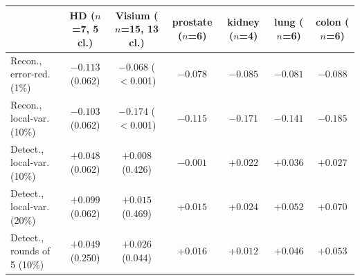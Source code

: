 \begin{tabular}{lcccccc}
\toprule
 & HD ($n$=7, 5 cl.) & Visium ($n$=15, 13 cl.) & prostate ($n$=6) & kidney ($n$=4) & lung ($n$=6) & colon ($n$=6) \\
\midrule
Recon., error-red. (1\%) & $-0.113$ (0.062) & $-0.068$ ($<$0.001) & $-0.078$ & $-0.085$ & $-0.081$ & $-0.088$ \\
Recon., local-var. (10\%) & $-0.103$ (0.062) & $-0.174$ ($<$0.001) & $-0.115$ & $-0.171$ & $-0.141$ & $-0.185$ \\
Detect., local-var. (10\%) & ${+}0.048$ (0.062) & ${+}0.008$ (0.426) & $-0.001$ & ${+}0.022$ & ${+}0.036$ & ${+}0.027$ \\
Detect., local-var. (20\%) & ${+}0.099$ (0.062) & ${+}0.015$ (0.469) & ${+}0.015$ & ${+}0.024$ & ${+}0.052$ & ${+}0.070$ \\
Detect., rounds of 5 (10\%) & ${+}0.049$ (0.250) & ${+}0.026$ (0.044) & ${+}0.016$ & ${+}0.012$ & ${+}0.046$ & ${+}0.053$ \\
\bottomrule
\end{tabular}